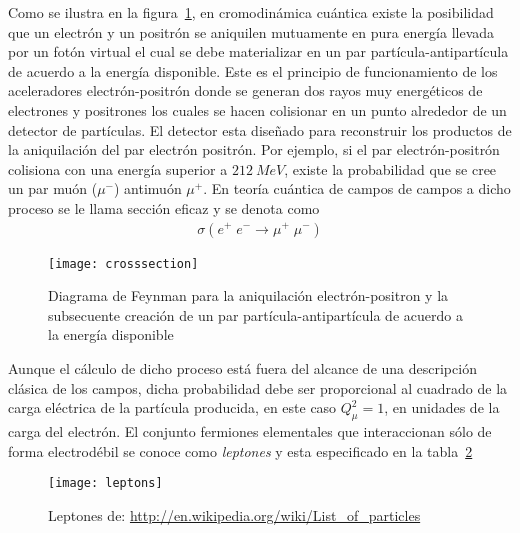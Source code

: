 Como se ilustra en la figura~\ref{fig:crosssection}, en cromodinámica cuántica existe la posibilidad que un electrón y un positrón se aniquilen mutuamente en pura energía llevada por un fotón virtual el cual se debe materializar en un par partícula-antipartícula de acuerdo a la energía disponible. Este es el principio de funcionamiento de los aceleradores electrón-positrón donde se generan dos rayos muy energéticos de electrones y positrones los cuales se hacen colisionar en un punto alrededor de un detector de partículas. El detector esta diseñado para reconstruir los productos de la aniquilación del par electrón positrón. Por ejemplo, si el par electrón-positrón colisiona con una energía superior a $\SI{212}{MeV}$, existe la probabilidad que se cree un par muón ($\mu^-$) antimuón $\mu^{+}$. En teoría cuántica de campos de campos a dicho proceso se le llama sección eficaz y se denota como
\begin{align}
  \sigma(e^+\;e^-\rightarrow \mu^+\;\mu^-)
\end{align}

\begin{figure}
  \centering
  \texttt{[image: crosssection]}
  \caption{Diagrama de Feynman para la aniquilación electrón-positron y la subsecuente creación de un par partícula-antipartícula de acuerdo a la energía disponible}
  \label{fig:crosssection}
\end{figure}

Aunque el cálculo de dicho proceso está fuera del alcance de una descripción clásica de los campos, dicha probabilidad debe ser proporcional al cuadrado de la carga eléctrica de la partícula producida, en este caso $Q_{\mu}^2=1$, en unidades de la carga del electrón. El conjunto fermiones elementales que interaccionan sólo de forma electrodébil se conoce como \emph{leptones} y esta especificado en la tabla~\ref{tab:leptons}
\begin{frame}
\begin{figure}
  \centering
  \texttt{[image: leptons]}
  \caption{Leptones de: \url{http://en.wikipedia.org/wiki/List_of_particles}}
  \label{tab:leptons}
\end{figure}
\end{frame}

